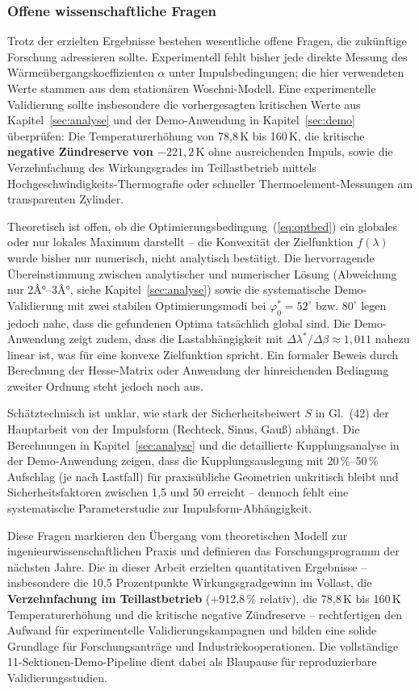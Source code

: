 ﻿\documentclass[a4paper,12pt]{article}
\begin{document}
\subsubsection{Offene wissenschaftliche Fragen}

Trotz der erzielten Ergebnisse bestehen wesentliche offene Fragen,
die zukünftige Forschung adressieren sollte. Experimentell
fehlt bisher jede direkte Messung des Wärmeübergangskoeffizienten
$\alpha$ unter Impulsbedingungen; die hier verwendeten Werte
stammen aus dem stationären Woschni-Modell. Eine experimentelle
Validierung sollte insbesondere die vorhergesagten kritischen Werte
aus Kapitel~\ref{sec:analyse} und der Demo-Anwendung in
Kapitel~\ref{sec:demo} überprüfen: Die Temperaturerhöhung von
78{,}8\,K bis 160\,K, die kritische \textbf{negative Zündreserve von
$-221{,}2\,\text{K}$} ohne ausreichenden Impuls, sowie die
Verzehnfachung des Wirkungsgrades im Teillastbetrieb mittels
Hochgeschwindigkeits-Thermografie oder schneller Thermoelement-Messungen
am transparenten Zylinder.

Theoretisch ist offen, ob die Optimierungsbedingung~(\ref{eq:optbed}) ein
globales oder nur lokales Maximum darstellt -- die Konvexität
der Zielfunktion $f(\lambda)$ wurde bisher nur numerisch, nicht
analytisch bestätigt. Die hervorragende Übereinstimmung zwischen
analytischer und numerischer Lösung (Abweichung nur 2Â°--3Â°,
siehe Kapitel~\ref{sec:analyse}) sowie die systematische Demo-Validierung
mit zwei stabilen Optimierungsmodi bei $\varphi_0^* = 52^\circ$ bzw.
$80^\circ$ legen jedoch nahe, dass die gefundenen Optima tatsächlich
global sind. Die Demo-Anwendung zeigt zudem, dass die Lastabhängigkeit
mit $\Delta\lambda^*/\Delta\beta \approx 1{,}011$ nahezu linear ist,
was für eine konvexe Zielfunktion spricht. Ein formaler Beweis durch
Berechnung der Hesse-Matrix oder Anwendung der hinreichenden Bedingung
zweiter Ordnung steht jedoch noch aus.

Schätztechnisch ist unklar, wie stark der Sicherheitsbeiwert $S$ in
Gl.~(42) der Hauptarbeit von der Impulsform (Rechteck, Sinus, Gauß) abhängt.
Die Berechnungen in Kapitel~\ref{sec:analyse} und die detaillierte
Kupplungsanalyse in der Demo-Anwendung zeigen, dass die
Kupplungsauslegung mit 20\,\%--50\,\% Aufschlag (je nach Lastfall)
für praxisübliche Geometrien unkritisch bleibt und Sicherheitsfaktoren
zwischen 1{,}5 und 50 erreicht -- dennoch fehlt eine systematische
Parameterstudie zur Impulsform-Abhängigkeit.

Diese Fragen markieren den Übergang vom theoretischen Modell
zur ingenieurwissenschaftlichen Praxis und definieren das
Forschungsprogramm der nächsten Jahre. Die in dieser Arbeit
erzielten quantitativen Ergebnisse -- insbesondere die 10{,}5 Prozentpunkte
Wirkungsgradgewinn im Vollast, die \textbf{Verzehnfachung im Teillastbetrieb}
(+912{,}8\,\% relativ), die 78{,}8\,K bis 160\,K Temperaturerhöhung und
die kritische negative Zündreserve -- rechtfertigen den Aufwand für
experimentelle Validierungskampagnen und bilden eine solide Grundlage für
Forschungsanträge und Industriekooperationen. Die vollständige
11-Sektionen-Demo-Pipeline dient dabei als Blaupause für
reproduzierbare Validierungsstudien.
\end{document}
